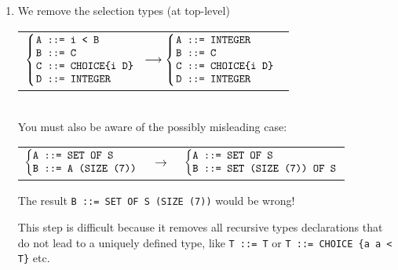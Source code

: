 \begin{enumerate}
  \item We remove the selection types (at top-level)\\
        {\small
        \begin{tabular}{l} 
          $\left\{\hspace*{-5pt}
             \begin{tabular}{l}
                \verb+A ::= i < B+\\
                \verb+B ::= C+\\
                \verb+C ::= CHOICE{i D}+\\
                \verb+D ::= INTEGER+
             \end{tabular}
            \right.
          \longrightarrow
          \left\{\hspace*{-5pt}
               \begin{tabular}{l}
                  \verb+A ::= INTEGER+\\
                  \verb+B ::= C+\\
                  \verb+C ::= CHOICE{i D}+\\
                  \verb+D ::= INTEGER+
               \end{tabular}
             \right.$
        \end{tabular}}\\
       You must also be aware of the possibly misleading case:\\
       {\small
       \begin{tabular}{@{}r@{\;}c@{\;}l@{}}
         $\left\{
            \begin{tabular}{@{}l@{}}
              \verb+A ::= SET OF S+\\
              \verb+B ::= A (SIZE (7))+
            \end{tabular}
          \right.$
         & $\longrightarrow$
         & $\left\{
            \begin{tabular}{@{}l@{}}
              \verb+A ::= SET OF S+\\ 
              \verb+B ::= SET (SIZE (7)) OF S+
            \end{tabular}
            \right.$
       \end{tabular}
       }
   
       The result \verb+B ::= SET OF S (SIZE (7))+ would be wrong!

       This step is difficult because it removes all recursive types
       declarations that do not lead to a uniquely defined type, like
       \texttt{T ::= T} or \texttt{T ::= CHOICE \{a a < T\}}
       etc. 


\end{enumerate}
